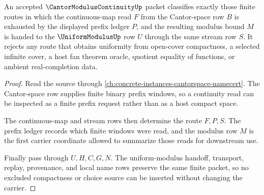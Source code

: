\begin{theorem}
\label{thm:cantor-modulus-continuity-classifier}
An accepted $\CantorModulusContinuityUp$ packet classifies exactly those finite routes in which the continuous-map read $F$ from the Cantor-space row $B$ is exhausted by the displayed prefix ledger $P$, and the resulting modulus bound $M$ is handed to the $\UniformModulusUp$ row $U$ through the same stream row $S$. It rejects any route that obtains uniformity from open-cover compactness, a selected infinite cover, a host fan theorem oracle, quotient equality of functions, or ambient real-completion data.
\end{theorem}
\begin{proof}
Read the source through \autoref{ch:concrete-instances-cantorspace-namecert}. The Cantor-space row supplies finite binary prefix windows, so a continuity read can be inspected as a finite prefix request rather than as a host compact space.

The continuous-map and stream rows then determine the route $F,P,S$. The prefix ledger records which finite windows were read, and the modulus row $M$ is the first carrier coordinate allowed to summarize those reads for downstream use.

Finally pass through $U,H,C,G,N$. The uniform-modulus handoff, transport, replay, provenance, and local name rows preserve the same finite packet, so no excluded compactness or choice source can be inserted without changing the carrier.
\end{proof}

